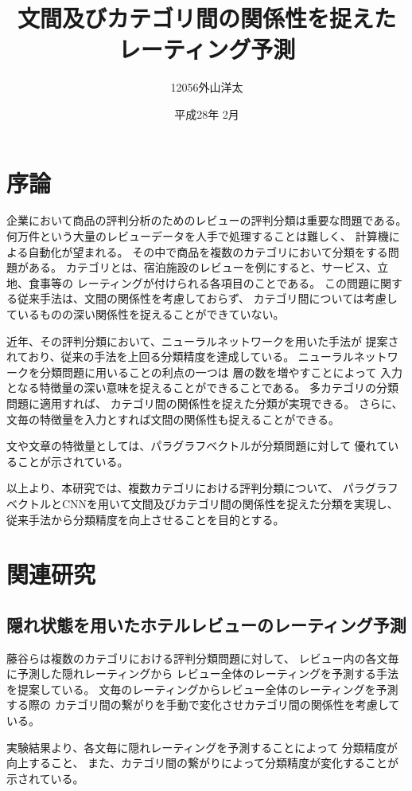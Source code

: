 \documentclass{ttithesis}
\title{文間及びカテゴリ間の関係性を捉えた\\レーティング予測}
\author{12056\hspace{16ex}外山洋太}
\date{平成28年 2月}
\begin{document}
\section{序論}

企業において商品の評判分析のためのレビューの評判分類は重要な問題である。
何万件という大量のレビューデータを人手で処理することは難しく、
計算機による自動化が望まれる。
その中で商品を複数のカテゴリにおいて分類をする問題がある。
カテゴリとは、宿泊施設のレビューを例にすると、サービス、立地、食事等の
レーティングが付けられる各項目のことである。
この問題に関する従来手法\cite{fujitani15}は、文間の関係性を考慮しておらず、
カテゴリ間については考慮しているものの深い関係性を捉えることができていない。

近年、その評判分類において、ニューラルネットワークを用いた手法が
提案されており、従来の手法を上回る分類精度を達成している。
ニューラルネットワークを分類問題に用いることの利点の一つは
層の数を増やすことによって
入力となる特徴量の深い意味を捉えることができることである。
多カテゴリの分類問題に適用すれば、
カテゴリ間の関係性を捉えた分類が実現できる。
さらに、文毎の特徴量を入力とすれば文間の関係性も捉えることができる。

文や文章の特徴量としては、パラグラフベクトル\cite{quoc14}が分類問題に対して
優れていることが示されている。

以上より、本研究では、複数カテゴリにおける評判分類について、
パラグラフベクトルとCNNを用いて文間及びカテゴリ間の関係性を捉えた分類を実現し、
従来手法から分類精度を向上させることを目的とする。



\section{関連研究}

\subsection{隠れ状態を用いたホテルレビューのレーティング予測}

藤谷ら\cite{fujitani15}は複数のカテゴリにおける評判分類問題に対して、
レビュー内の各文毎に予測した隠れレーティングから
レビュー全体のレーティングを予測する手法を提案している。
文毎のレーティングからレビュー全体のレーティングを予測する際の
カテゴリ間の繋がりを手動で変化させカテゴリ間の関係性を考慮している。

実験結果より、各文毎に隠れレーティングを予測することによって
分類精度が向上すること、
また、カテゴリ間の繋がりによって分類精度が変化することが示されている。
\end{document}
